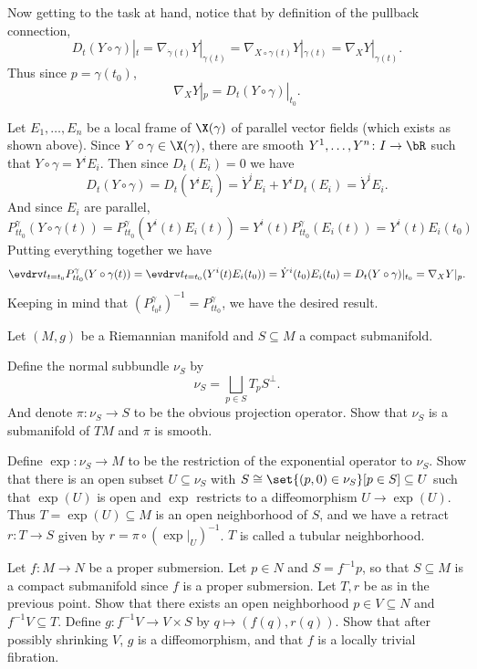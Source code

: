 Now getting to the task at hand, notice that by definition of the pullback connection,
$$ D_t(Y\circ\gamma)|_t = \nabla_{\dot\gamma(t)}Y|_{\gamma(t)} = \nabla_{X\circ\gamma(t)}Y|_{\gamma(t)} = \nabla_XY|_{\gamma(t)} . $$
Thus since $p=\gamma(t_0)$,
$$ \nabla_XY|_p = D_t(Y\circ\gamma)|_{t_0} . $$

Let $E_1,\dots,E_n$ be a local frame of $\X(\gamma)$ of parallel vector fields (which exists as shown above).
Since $Y\circ\gamma\in\X(\gamma)$, there are smooth $Y^1,\dots,Y^n\colon I\to\bR$ such that $Y\circ\gamma=Y^iE_i$.
Then since $D_t(E_i)=0$ we have
$$ D_t(Y\circ\gamma) = D_t(Y^iE_i) = \dot Y^iE_i + Y^iD_t(E_i) = \dot Y^iE_i . $$
And since $E_i$ are parallel,
$$ P^\gamma_{tt_0}(Y\circ\gamma(t)) = P^\gamma_{tt_0}(Y^i(t)E_i(t)) = Y^i(t)P^\gamma_{tt_0}(E_i(t)) = Y^i(t)E_i(t_0) $$
Putting everything together we have
$$ \evdrv t_{t=t_0}P^\gamma_{tt_0}(Y\circ\gamma(t)) = \evdrv t_{t=t_0}(Y^i(t)E_i(t_0)) = \dot Y^i(t_0)E_i(t_0) = D_t(Y\circ\gamma)|_{t_0} = \nabla_XY|_p . $$
Keeping in mind that $(P^\gamma_{t_0t})^{-1}=P^\gamma_{tt_0}$, we have the desired result.

\bprob

    Let $(M,g)$ be a Riemannian manifold and $S\subseteq M$ a compact submanifold.
    \benum
        \item Define the {\emphcolor normal subbundle} $\nu_S$ by
        $$ \nu_S = \bigsqcup_{p\in S}T_pS^\perp . $$
        And denote $\pi\colon\nu_S\to S$ to be the obvious projection operator.
        Show that $\nu_S$ is a submanifold of $TM$ and $\pi$ is smooth.

        \item Define $\exp\colon\nu_S\to M$ to be the restriction of the exponential operator to $\nu_S$.
        Show that there is an open subset $U\subseteq\nu_S$ with $S\cong\set{(p,0)\in\nu_S}[p\in S]\subseteq U$ such that $\exp(U)$ is open and
        $\exp$ restricts to a diffeomorphism $U\to\exp(U)$.
        Thus $T=\exp(U)\subseteq M$ is an open neighborhood of $S$, and we have a retract $r\colon T\to S$ given by $r=\pi\circ(\exp|_U)^{-1}$.
        $T$ is called a {\emphcolor tubular neighborhood}.

        \item Let $f\colon M\to N$ be a proper submersion.
        Let $p\in N$ and $S=f^{-1}p$, so that $S\subseteq M$ is a compact submanifold since $f$ is a proper submersion.
        Let $T,r$ be as in the previous point.
        Show that there exists an open neighborhood $p\in V\subseteq N$ and $f^{-1}V\subseteq T$.
        Define $g\colon f^{-1}V\to V\times S$ by $q\mapsto(f(q),r(q))$.
        Show that after possibly shrinking $V$, $g$ is a diffeomorphism, and that $f$ is a locally trivial fibration.
    \eenum

